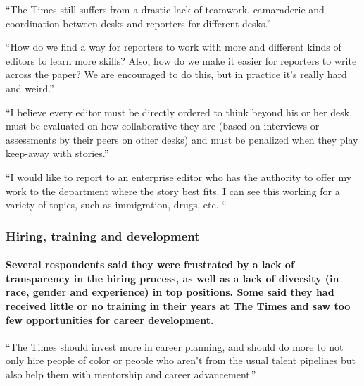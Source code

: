 ``The Times still suffers from a drastic lack of teamwork, camaraderie
and coordination between desks and reporters for different desks.''

``How do we find a way for reporters to work with more and different
kinds of editors to learn more skills? Also, how do we make it easier
for reporters to write across the paper? We are encouraged to do this,
but in practice it's really hard and weird.''

``I believe every editor must be directly ordered to think beyond his or
her desk, must be evaluated on how collaborative they are (based on
interviews or assessments by their peers on other desks) and must be
penalized when they play keep-away with stories.''

``I would like to report to an enterprise editor who has the authority
to offer my work to the department where the story best fits. I can see
this working for a variety of topics, such as immigration, drugs, etc.
``

\hypertarget{hiring-training-and-development}{%
\subsubsection{Hiring, training and
development}\label{hiring-training-and-development}}

\hypertarget{several-respondents-said-they-were-frustrated-by-a-lack-of-transparency-in-the-hiring-process-as-well-as-a-lack-of-diversity-in-race-gender-and-experience-in-top-positions-some-said-they-had-received-little-or-no-training-in-their-years-at-the-times-and-saw-too-few-opportunities-for-career-development}{%
\paragraph{Several respondents said they were frustrated by a lack of
transparency in the hiring process, as well as a lack of diversity (in
race, gender and experience) in top positions. Some said they had
received little or no training in their years at The Times and saw too
few opportunities for career
development.}\label{several-respondents-said-they-were-frustrated-by-a-lack-of-transparency-in-the-hiring-process-as-well-as-a-lack-of-diversity-in-race-gender-and-experience-in-top-positions-some-said-they-had-received-little-or-no-training-in-their-years-at-the-times-and-saw-too-few-opportunities-for-career-development}}

``The Times should invest more in career planning, and should do more to
not only hire people of color or people who aren't from the usual talent
pipelines but also help them with mentorship and career advancement.''

